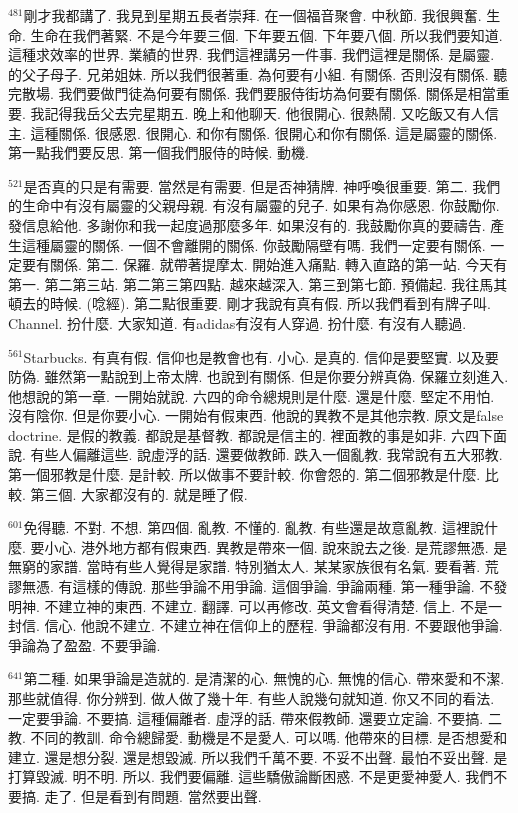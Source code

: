 \documentclass{book}
\begin{document}
$^{481}$剛才我都講了.
我見到星期五長者崇拜.
在一個福音聚會.
中秋節.
我很興奮.
生命.
生命在我們著緊.
不是今年要三個.
下年要五個.
下年要八個.
所以我們要知道.
這種求效率的世界.
業績的世界.
我們這裡講另一件事.
我們這裡是關係.
是屬靈.
的父子母子.
兄弟姐妹.
所以我們很著重.
為何要有小組.
有關係.
否則沒有關係.
聽完散場.
我們要做門徒為何要有關係.
我們要服侍街坊為何要有關係.
關係是相當重要.
我記得我岳父去完星期五.
晚上和他聊天.
他很開心.
很熱鬧.
又吃飯又有人信主.
這種關係.
很感恩.
很開心.
和你有關係.
很開心和你有關係.
這是屬靈的關係.
第一點我們要反思.
第一個我們服侍的時候.
動機.

$^{521}$是否真的只是有需要.
當然是有需要.
但是否神猜牌.
神呼喚很重要.
第二.
我們的生命中有沒有屬靈的父親母親.
有沒有屬靈的兒子.
如果有為你感恩.
你鼓勵你.
發信息給他.
多謝你和我一起度過那麼多年.
如果沒有的.
我鼓勵你真的要禱告.
產生這種屬靈的關係.
一個不會離開的關係.
你鼓勵隔壁有嗎.
我們一定要有關係.
一定要有關係.
第二.
保羅.
就帶著提摩太.
開始進入痛點.
轉入直路的第一站.
今天有第一.
第二第三站.
第二第三第四點.
越來越深入.
第三到第七節.
預備起.
我往馬其頓去的時候.
(唸經).
第二點很重要.
剛才我說有真有假.
所以我們看到有牌子叫.
Channel.
扮什麼.
大家知道.
有adidas有沒有人穿過.
扮什麼.
有沒有人聽過.

$^{561}$Starbucks.
有真有假.
信仰也是教會也有.
小心.
是真的.
信仰是要堅實.
以及要防偽.
雖然第一點說到上帝太牌.
也說到有關係.
但是你要分辨真偽.
保羅立刻進入.
他想說的第一章.
一開始就說.
六四的命令總規則是什麼.
還是什麼.
堅定不用怕.
沒有陰你.
但是你要小心.
一開始有假東西.
他說的異教不是其他宗教.
原文是false doctrine.
是假的教義.
都說是基督教.
都說是信主的.
裡面教的事是如非.
六四下面說.
有些人偏離這些.
說虛浮的話.
還要做教師.
跌入一個亂教.
我常說有五大邪教.
第一個邪教是什麼.
是計較.
所以做事不要計較.
你會怨的.
第二個邪教是什麼.
比較.
第三個.
大家都沒有的.
就是睡了假.

$^{601}$免得聽.
不對.
不想.
第四個.
亂教.
不懂的.
亂教.
有些還是故意亂教.
這裡說什麼.
要小心.
港外地方都有假東西.
異教是帶來一個.
說來說去之後.
是荒謬無憑.
是無窮的家譜.
當時有些人覺得是家譜.
特別猶太人.
某某家族很有名氣.
要看著.
荒謬無憑.
有這樣的傳說.
那些爭論不用爭論.
這個爭論.
爭論兩種.
第一種爭論.
不發明神.
不建立神的東西.
不建立.
翻譯.
可以再修改.
英文會看得清楚.
信上.
不是一封信.
信心.
他說不建立.
不建立神在信仰上的歷程.
爭論都沒有用.
不要跟他爭論.
爭論為了盈盈.
不要爭論.

$^{641}$第二種.
如果爭論是造就的.
是清潔的心.
無愧的心.
無愧的信心.
帶來愛和不潔.
那些就值得.
你分辨到.
做人做了幾十年.
有些人說幾句就知道.
你又不同的看法.
一定要爭論.
不要搞.
這種偏離者.
虛浮的話.
帶來假教師.
還要立定論.
不要搞.
二教.
不同的教訓.
命令總歸愛.
動機是不是愛人.
可以嗎.
他帶來的目標.
是否想愛和建立.
還是想分裂.
還是想毀滅.
所以我們千萬不要.
不妥不出聲.
最怕不妥出聲.
是打算毀滅.
明不明.
所以.
我們要偏離.
這些驕傲論斷困惑.
不是更愛神愛人.
我們不要搞.
走了.
但是看到有問題.
當然要出聲.
\end{document}

